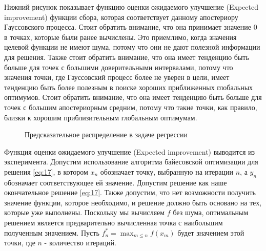 Нижний рисунок показывает функцию оценки ожидаемого улучшение (Expected improvement) функции сбора, которая соответствует данному  апостериору Гауссовского процесса. Стоит обратить внимание, что она принимает значение 0 в точках, которые были ранее вычислены. Это приемлимо, когда значения целевой функции не имеют шума, потому что они не дают полезной информации для решения. Также стоит обратить внимание, что она имеет тенденцию быть больше для точек с большими доверительными интервалами, потому что значения точки, где Гауссовский процесс более не уверен в цели, имеет тенденцию быть более полезным в поиске хороших приближенных глобальных оптимумов. Стоит обратить внимание, что она имеет тенденцию быть больше для точек с большим апостериорным средним, потому что такие точки, как правило, близки к хорошим приблизительным глобальным оптимумам.
\begin{figure}[H]
	\captionsetup{justification=centering}
	\caption{Предсказательное распределение в задаче регрессии}
	\label{fig:one_iter_bay_opt}
\end{figure}

Функция оценки ожидаемого улучшение (Expected improvement) выводится из эксперимента. Допустим использование алгоритма байесовской оптимизации для решения \eqref{eq:17}, в котором $x_n$ обозначает точку, выбранную на итерации $n$, а $y_n$ обозначает соответствующее ей значение. Допустим решение как наше окончательное решение \eqref{eq:17}. Также допустим, что нет возможности получить значение функции, которое необходимо, и решение должно быть основано на тех, которые уже выполнены. Поскольку мы вычисляем $f$ без шума, оптимальным решением является предварительно вычисленная точка с наибольшим полученным значением. Пусть $f_n^* = \max_{m \leq n} f(x_m)$ будет значением этой точки, где $n$ - количество итераций.

